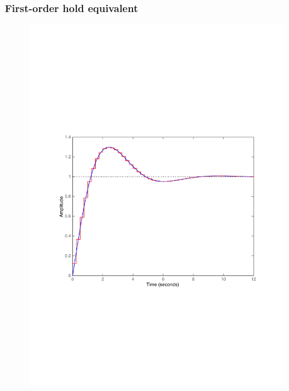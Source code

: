 \begin{frame}
	\frametitle{First-order hold equivalent}
	\vspace{-0.7em}
	\begin{figure}
		\centering
		\includegraphics[width=0.85\linewidth]{vb2}
	\end{figure}
\end{frame}

